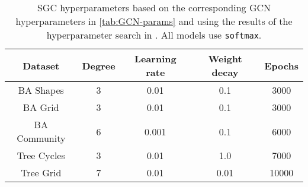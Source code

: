 \begin{table}
    \centering
    \begin{tabular}{c|cccc}
        \textbf{Dataset} &
        \textbf{Degree} &
        \textbf{Learning rate} &
        \textbf{Weight decay} &
        \textbf{Epochs} \\
        \midrule
        BA Shapes       & 3 & 0.01 & 0.1 & 3000 \\
        BA Grid         & 3 & 0.01 & 0.1 & 3000 \\
        BA Community    & 6 & 0.001 & 0.1 & 6000 \\
        Tree Cycles     & 3 & 0.01 & 1.0 & 7000 \\
        Tree Grid       & 7 & 0.01 & 0.01 & 10000 \\
    \end{tabular}
    \caption{SGC hyperparameters based on the corresponding GCN hyperparameters in \ref{tab:GCN-params} and using the results of the hyperparameter search in . All models use \texttt{softmax}.}
    \label{tab:SGC-params}
\end{table}


